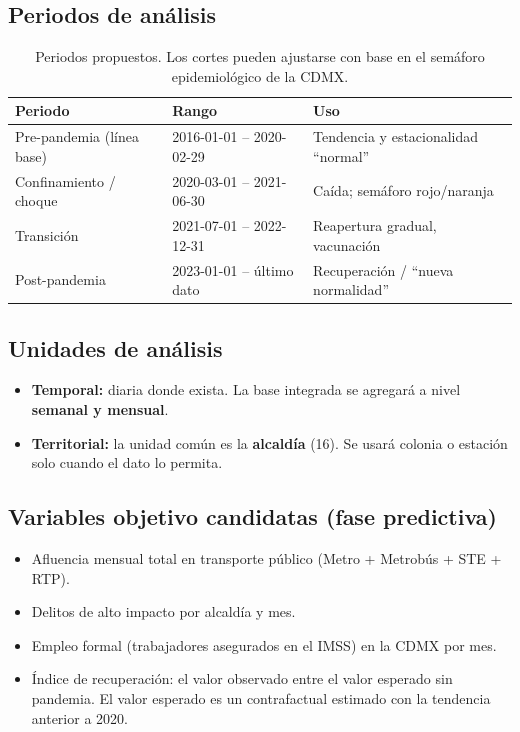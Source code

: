 \subsection{Periodos de análisis}
\begin{table}[h]
\centering
\caption{Periodos propuestos. Los cortes pueden ajustarse con base en el semáforo epidemiológico de la CDMX.}
\begin{tabular}{lll}
\toprule
\textbf{Periodo} & \textbf{Rango} & \textbf{Uso} \\
\midrule
Pre-pandemia (línea base) & 2016-01-01 -- 2020-02-29 & Tendencia y estacionalidad \enquote{normal} \\
Confinamiento / choque    & 2020-03-01 -- 2021-06-30 & Caída; semáforo rojo/naranja \\
Transición                & 2021-07-01 -- 2022-12-31 & Reapertura gradual, vacunación \\
Post-pandemia             & 2023-01-01 -- último dato & Recuperación / \enquote{nueva normalidad} \\
\bottomrule
\end{tabular}
\end{table}

\subsection{Unidades de análisis}
\begin{itemize}
  \item \textbf{Temporal:} diaria donde exista. La base integrada se agregará a nivel \textbf{semanal y mensual}.
  \item \textbf{Territorial:} la unidad común es la \textbf{alcaldía} (16). Se usará colonia o estación
        solo cuando el dato lo permita.
\end{itemize}

\subsection{Variables objetivo candidatas (fase predictiva)}
\begin{itemize}
  \item Afluencia mensual total en transporte público (Metro + Metrobús + STE + RTP).
  \item Delitos de alto impacto por alcaldía y mes.
  \item Empleo formal (trabajadores asegurados en el IMSS) en la CDMX por mes.
  \item Índice de recuperación: el valor observado entre el valor esperado sin pandemia. El valor
        esperado es un contrafactual estimado con la tendencia anterior a 2020.
\end{itemize}

